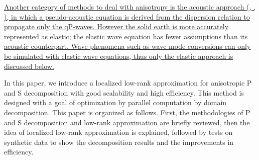 \documentclass[manuscript,ulem,graphix,revised]{geophysics}
\begin{document}
\marginnote{[5]}\uline{Another category of methods to deal with anisotropy is the acoustic approach (\mbox{\citeauthor{alkhalifah98}}, \mbox{\citeyear{alkhalifah98}}, \mbox{\citeyear{alkhalifah00}}), in which a pseudo-acoustic equation is derived from the dispersion relation to propagate only the qP-waves. However the solid earth is more accurately represented as elastic; the elastic wave equation has fewer assumptions than its acoustic counterpart. Wave phenomena such as wave mode conversions can only be simulated with elastic wave equations, thus only the elastic approach is discussed below.}

In this paper, we introduce a localized low-rank approximation for anisotropic P and S decomposition with good scalability and high efficiency. This method is designed with a goal of optimization by parallel computation by domain decomposition. 
This paper is organized as follows. First, the methodologies of P and S decomposition and low-rank approximation are briefly reviewed, then the idea of localized low-rank approximation is explained, followed by tests on synthetic data to show the decomposition results and the improvements in efficiency. 

\end{document}
